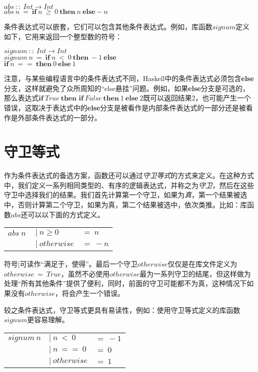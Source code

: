 \noindent\hspace*{1cm}$abs~::~Int \rightarrow Int$\\
\hspace*{1cm}$abs~n~=~\textbf{if}~n~ \geq ~0~ \textbf{then}~n~ \textbf{else} -n $

条件表达式可以嵌套，它们可以包含其他条件表达式。例如，库函数$signum$定义如下，它用来返回一个整型数的符号：

\noindent\hspace*{1cm}$signum~::~Int \rightarrow Int$\\
\hspace*{1cm}$signum~n~=~\textbf{if}~n~<~0~\textbf{then}~-1~\textbf{else} $\\
\hspace*{4cm}$\textbf{if}~n~==~\textbf{then}~0~\textbf{else}~1$

注意，与某些编程语言中的条件表达式不同，Haskell中的条件表达式必须包含\textbf{else}分支，这样就避免了众所周知的“else悬挂”问题。例如，如果\textbf{else}分支是可选的，那么表达式$\textbf{if}~True~\textbf{then~if}~False~\textbf{then}~1~\textbf{else}~2$既可以返回结果2，也可能产生一个错误，这取决于表达式中的\textbf{else}分支是被看作是内部条件表达式的一部分还是被看作是外部条件表达式的一部分。

\section{守卫等式}
作为条件表达式的备选方案，函数还可以通过\textit{守卫等式}的方式来定义。在这种方式中，我们定义一系列相同类型的、有序的逻辑表达式，并称之为\textit{守卫}，然后在这些守卫中选择我们的结果。我们首先计算第一个守卫，如果为\textit{真}，第一个结果被选中，否则计算第二个守卫，如果为真，第二个结果被选中，依次类推。比如：库函数$abs$还可以以下面的方式定义。

\begin{tabular}[t]{lll}
$abs~n~$&$|~n\geq 0$&$= ~ n$\\
&$|~otherwise$&$=~-n$\\
\end{tabular}

符号|可读作“满足于，使得”。最后一个守卫$otherwise$仅仅是在库文件定义为$otherwise~=~True$，虽然不必使用$otherwise$最为一系列守卫的结尾，但这样做为处理“所有其他条件”提供了便利，同时，前面的守卫可能都不为真，这种情况下如果没有$otherwise$，将会产生一个错误。

较之条件表达式，守卫等式更具有易读性，例如：使用守卫等式定义的库函数$signum$更容易理解。


\begin{tabular}[t]{lll}
$signum~n$&$|~n~<~0$&$=~-1$\\
&$|~n~==~0$&$=~0$\\
&$|~otherwise$&$=~1$\\
\end{tabular}

